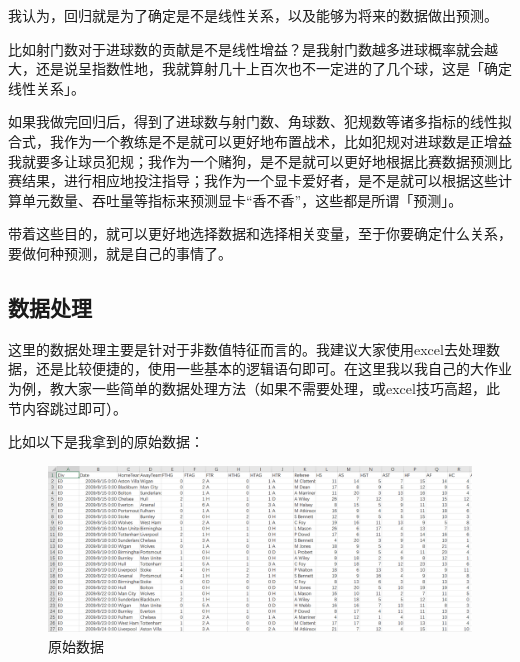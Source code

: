 \documentclass[10pt, a4paper]{article}
\begin{document}
我认为，回归就是为了确定是不是线性关系，以及能够为将来的数据做出预测。\par
比如射门数对于进球数的贡献是不是线性增益？是我射门数越多进球概率就会越大，还是说呈指数性地，我就算射几十上百次也不一定进的了几个球，这是「确定线性关系」。\par
如果我做完回归后，得到了进球数与射门数、角球数、犯规数等诸多指标的线性拟合式，我作为一个教练是不是就可以更好地布置战术，比如犯规对进球数是正增益我就要多让球员犯规；我作为一个赌狗，是不是就可以更好地根据比赛数据预测比赛结果，进行相应地投注指导；我作为一个显卡爱好者，是不是就可以根据这些计算单元数量、吞吐量等指标来预测显卡“香不香”，这些都是所谓「预测」。\par
带着这些目的，就可以更好地选择数据和选择相关变量，至于你要确定什么关系，要做何种预测，就是自己的事情了。

\subsection{数据处理}
这里的数据处理主要是针对于非数值特征而言的。我建议大家使用excel去处理数据，还是比较便捷的，使用一些基本的逻辑语句即可。在这里我以我自己的大作业为例，教大家一些简单的数据处理方法（如果不需要处理，或excel技巧高超，此节内容跳过即可）。\par
比如以下是我拿到的原始数据：
\begin{figure}[H]
    \centering
    \includegraphics[width=\linewidth]{raw.png}
    \caption{原始数据}
    \label{fig:raw}
\end{figure}\par
\end{document}
